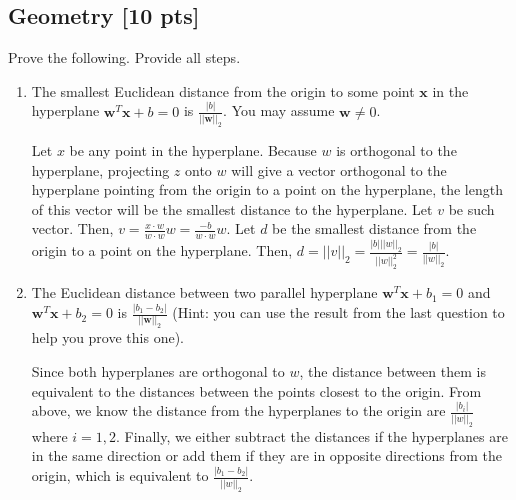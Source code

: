 \documentclass[a4paper]{article}
\theoremstyle{definition}
\newenvironment{soln}{
	\leavevmode\color{blue}\ignorespaces
}{}
\begin{document}
	\subsection{Geometry [10 pts]}
	Prove the following.  Provide all steps.
	\begin{enumerate}
		\item 	The smallest Euclidean distance from the origin to some point $\mathbf{x}$ in the hyperplane $\mathbf{w}^{T}\mathbf{x} + b = 0$ is $\frac{|b|}{||\mathbf{w}||_2}$.  You may assume $\mathbf{w} \neq 0$.\\
		\begin{soln}
			Let $x$ be any point in the hyperplane. 
			Because $w$ is orthogonal to the hyperplane, projecting $z$ onto $w$ will give a vector orthogonal to the hyperplane pointing from the origin to a point on the hyperplane, the length of this vector will be the smallest distance to the hyperplane.
			Let $v$ be such vector.
			Then, $v = \frac{x \cdot w}{w \cdot w} w = \frac{-b}{w \cdot w} w$.
			Let $d$ be the smallest distance from the origin to a point on the hyperplane.
			Then, $d = ||v||_2 = \frac{|b| ||w||_2}{||w||_2^{2}} = \frac{|b|}{||w||_2}$.
		\end{soln}
		
		\item 	The Euclidean distance between two parallel hyperplane $\mathbf{w}^{T}\mathbf{x} + b_1 = 0$ and $\mathbf{w}^{T}\mathbf{x} + b_2 = 0$ is $\frac{|b_1 - b_2|}{||\mathbf{w}||_2}$ (Hint: you can use the result from the last question to help you prove this one).\\
		\begin{soln}
			Since both hyperplanes are orthogonal to $w$, the distance between them is equivalent to the distances between the points closest to the origin.
			From above, we know the distance from the hyperplanes to the origin are $\frac{|b_i|}{||w||_2}$ where $i = 1,2$.
			Finally, we either subtract the distances if the hyperplanes are in the same direction or add them if they are in opposite directions from the origin, which is equivalent to $\frac{|b_1 - b_2|}{||w||_2}$.
		\end{soln}
		
	\end{enumerate}
	
	
	
\end{document}
